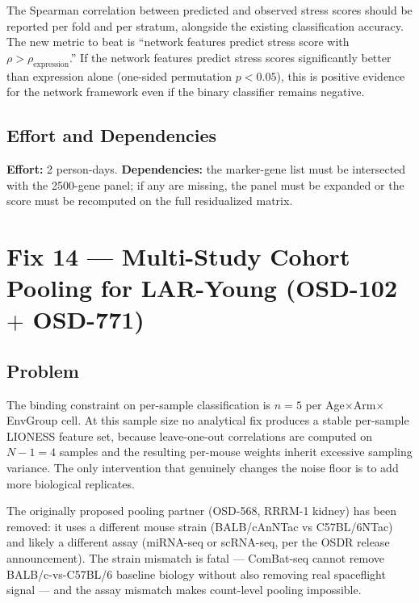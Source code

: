 \documentclass[11pt]{article}
\begin{document}
The Spearman correlation between predicted and observed stress scores should be reported per fold and per stratum, alongside the existing classification accuracy. The new metric to beat is ``network features predict stress score with $\rho > \rho_{\text{expression}}$.'' If the network features predict stress scores significantly better than expression alone (one-sided permutation $p < 0.05$), this is positive evidence for the network framework even if the binary classifier remains negative.

\subsection{Effort and Dependencies}

\textbf{Effort:} 2 person-days. \textbf{Dependencies:} the marker-gene list must be intersected with the 2500-gene panel; if any are missing, the panel must be expanded or the score must be recomputed on the full residualized matrix.

\section{Fix 14 --- Multi-Study Cohort Pooling for LAR-Young (OSD-102 $+$ OSD-771)}

\subsection{Problem}

The binding constraint on per-sample classification is $n{=}5$ per Age$\times$Arm$\times$EnvGroup cell. At this sample size no analytical fix produces a stable per-sample LIONESS feature set, because leave-one-out correlations are computed on $N{-}1{=}4$ samples and the resulting per-mouse weights inherit excessive sampling variance. The only intervention that genuinely changes the noise floor is to add more biological replicates.

The originally proposed pooling partner (OSD-568, RRRM-1 kidney) has been removed: it uses a different mouse strain (BALB/cAnNTac vs C57BL/6NTac) and likely a different assay (miRNA-seq or scRNA-seq, per the OSDR release announcement). The strain mismatch is fatal --- ComBat-seq cannot remove BALB/c-vs-C57BL/6 baseline biology without also removing real spaceflight signal --- and the assay mismatch makes count-level pooling impossible.
\end{document}
